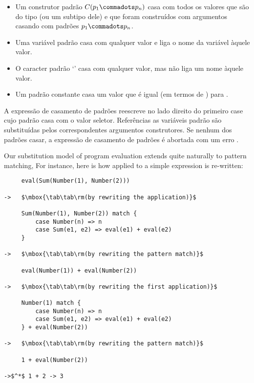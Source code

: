 \begin{itemize}
\item
Um construtor padrão $C(p_1 \commadots p_n)$ casa com todos os valores que são 
do tipo  (ou um subtipo dele) e que foram construídos com argumentos 
casando com padrões $p_1 \commadots p_n$.

\item 
Uma variável padrão  casa com qualquer valor e liga o nome da variável àquele valor.

\item 
O caracter padrão `\code{_}' casa com qualquer valor, mas não liga um nome àquele valor.

\item 
Um padrão constante  casa um valor que é igual (em termos de \code{==}) para .

\end{itemize}



A expressão de casamento de padrões reescreve no lado direito do primeiro case cujo
padrão casa com o valor seletor. Referências as variáveis padrão são substituídas pelos 
correspondentes argumentos construtores. Se nenhum dos padrões casar, a expressão 
de casamento de padrões é abortada com um erro .  


\example Our substitution model of program evaluation extends quite naturally to pattern matching, For instance, here is how  applied to a simple expression is re-written:
\begin{lstlisting}
     eval(Sum(Number(1), Number(2)))

->   $\mbox{\tab\tab\rm(by rewriting the application)}$

     Sum(Number(1), Number(2)) match {
         case Number(n) => n
         case Sum(e1, e2) => eval(e1) + eval(e2)
     }

->   $\mbox{\tab\tab\rm(by rewriting the pattern match)}$

     eval(Number(1)) + eval(Number(2))

->   $\mbox{\tab\tab\rm(by rewriting the first application)}$

     Number(1) match {
         case Number(n) => n
         case Sum(e1, e2) => eval(e1) + eval(e2)
     } + eval(Number(2))

->   $\mbox{\tab\tab\rm(by rewriting the pattern match)}$

     1 + eval(Number(2))

->$^*$ 1 + 2 -> 3
\end{lstlisting}

